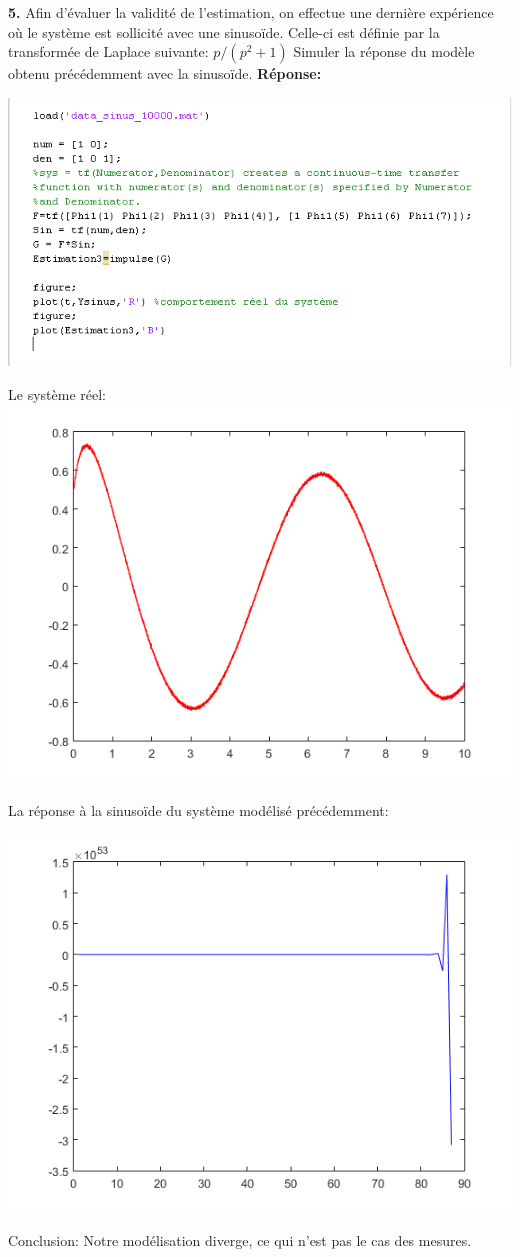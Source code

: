 \documentclass[12pt]{article}
\begin{document}
\textbf{5.} Afin d'évaluer la validité de l'estimation, on effectue une dernière expérience où le système est sollicité avec une sinusoïde. Celle-ci est définie par la transformée de Laplace suivante:
\smallbreak
$
p/(p^2 + 1)
$
\smallbreak
Simuler la réponse du modèle obtenu précédemment avec la sinusoïde.
\smallbreak
\textbf{Réponse:}
\begin{flushleft}
\includegraphics{2_5.PNG}
\end{flushleft}
\begin{flushleft}
Le système réel:
\includegraphics{Sin.PNG}
\end{flushleft}
La réponse à la sinusoïde du système modélisé précédemment:
\begin{flushleft}
\includegraphics{Estimation_sin.PNG}
\end{flushleft}
Conclusion: Notre modélisation diverge, ce qui n'est pas le cas des mesures. 
\end{document}
